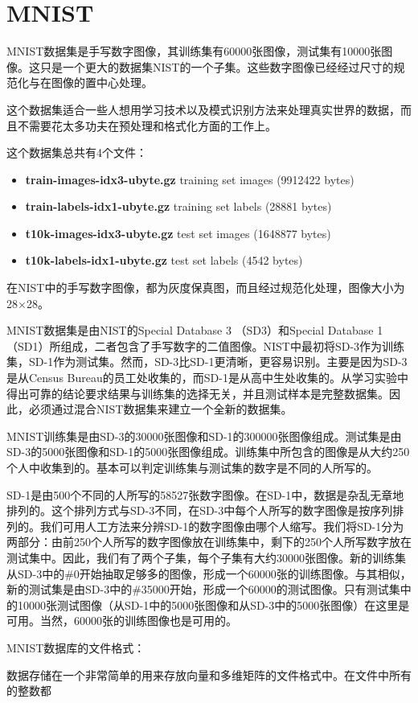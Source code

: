 \section{MNIST}
MNIST数据集是手写数字图像，其训练集有60000张图像，测试集有10000张图像。这只是一个更大的数据集NIST的一个子集。这些数字图像已经经过尺寸的规范化与在图像的置中心处理。

这个数据集适合一些人想用学习技术以及模式识别方法来处理真实世界的数据，而且不需要花太多功夫在预处理和格式化方面的工作上。

这个数据集总共有4个文件：
\begin{itemize}
\item \textbf{{\footnotesize{train-images-idx3-ubyte.gz}}} {\footnotesize{training set images (9912422 bytes)}} 
\item \textbf{{\footnotesize{train-labels-idx1-ubyte.gz}}} {\footnotesize{training set labels (28881 bytes)}} 
\item \textbf{{\footnotesize{t10k-images-idx3-ubyte.gz}}} {\footnotesize{test set images (1648877 bytes)}} 
\item \textbf{{\footnotesize{t10k-labels-idx1-ubyte.gz}}} {\footnotesize{test set labels (4542 bytes)}}
\end{itemize}

在NIST中的手写数字图像，都为灰度保真图，而且经过规范化处理，图像大小为28$\times$28。

MNIST数据集是由NIST的Special Database 3 （SD3）和Special Database 1（SD1）所组成，二者包含了手写数字的二值图像。NIST中最初将SD-3作为训练集，SD-1作为测试集。然而，SD-3比SD-1更清晰，更容易识别。主要是因为SD-3是从Census Bureau的员工处收集的，而SD-1是从高中生处收集的。从学习实验中得出可靠的结论要求结果与训练集的选择无关，并且测试样本是完整数据集。因此，必须通过混合NIST数据集来建立一个全新的数据集。

MNIST训练集是由SD-3的30000张图像和SD-1的300000张图像组成。测试集是由SD-3的5000张图像和SD-1的5000张图像组成。训练集中所包含的图像是从大约250个人中收集到的。基本可以判定训练集与测试集的数字是不同的人所写的。

SD-1是由500个不同的人所写的58527张数字图像。在SD-1中，数据是杂乱无章地排列的。这个排列方式与SD-3不同，在SD-3中每个人所写的数字图像是按序列排列的。我们可用人工方法来分辨SD-1的数字图像由哪个人缩写。我们将SD-1分为两部分：由前250个人所写的数字图像放在训练集中，剩下的250个人所写数字放在测试集中。因此，我们有了两个子集，每个子集有大约30000张图像。新的训练集从SD-3中的\#0开始抽取足够多的图像，形成一个60000张的训练图像。与其相似，新的测试集是由SD-3中的\#35000开始，形成一个60000的测试图像。只有测试集中的10000张测试图像（从SD-1中的5000张图像和从SD-3中的5000张图像）在这里是可用。当然，60000张的训练图像也是可用的。

MNIST数据库的文件格式：

数据存储在一个非常简单的用来存放向量和多维矩阵的文件格式中。在文件中所有的整数都

